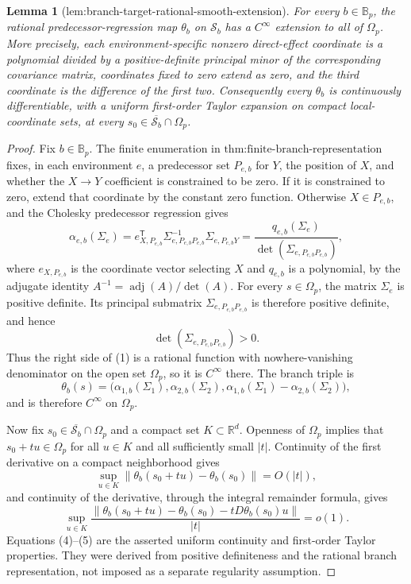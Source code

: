 \documentclass{article}
\newtheorem{lemma}{Lemma}
\begin{document}
\begin{lemma}[lem:branch-target-rational-smooth-extension]\label{lem:branch-target-rational-smooth-extension}
For every \(b\in\mathbb B_p\), the rational predecessor-regression map \(\theta_b\) on \(\mathcal S_b\) has a \(C^\infty\) extension to all of \(\Omega_p\). More precisely, each environment-specific nonzero direct-effect coordinate is a polynomial divided by a positive-definite principal minor of the corresponding covariance matrix, coordinates fixed to zero extend as zero, and the third coordinate is the difference of the first two. Consequently every \(\theta_b\) is continuously differentiable, with a uniform first-order Taylor expansion on compact local-coordinate sets, at every \(s_0\in\overline{\mathcal S_b}\cap\Omega_p\).
\end{lemma}
\begin{proof}
Fix \(b\in\mathbb B_p\). The finite enumeration in \(\text{thm:finite-branch-representation}\) fixes, in each environment \(e\), a predecessor set \(P_{e,b}\) for \(Y\), the position of \(X\), and whether the \(X\to Y\) coefficient is constrained to be zero. If it is constrained to zero, extend that coordinate by the constant zero function. Otherwise \(X\in P_{e,b}\), and the Cholesky predecessor regression gives
\[
 \alpha_{e,b}(\Sigma_e)
 =e_{X,P_{e,b}}^{\mathsf T}
   \Sigma_{e,P_{e,b}P_{e,b}}^{-1}
   \Sigma_{e,P_{e,b}Y}
 =\frac{q_{e,b}(\Sigma_e)}
        {\det(\Sigma_{e,P_{e,b}P_{e,b}})},
 \tag{1}
\]
where \(e_{X,P_{e,b}}\) is the coordinate vector selecting \(X\) and \(q_{e,b}\) is a polynomial, by the adjugate identity \(A^{-1}=\operatorname{adj}(A)/\det(A)\). For every \(s\in\Omega_p\), the matrix \(\Sigma_e\) is positive definite. Its principal submatrix \(\Sigma_{e,P_{e,b}P_{e,b}}\) is therefore positive definite, and hence
\[
 \det(\Sigma_{e,P_{e,b}P_{e,b}})>0.
 \tag{2}
\]
Thus the right side of (1) is a rational function with nowhere-vanishing denominator on the open set \(\Omega_p\), so it is \(C^\infty\) there. The branch triple is
\[
 \theta_b(s)=
 \bigl(\alpha_{1,b}(\Sigma_1),
       \alpha_{2,b}(\Sigma_2),
       \alpha_{1,b}(\Sigma_1)-\alpha_{2,b}(\Sigma_2)\bigr),
 \tag{3}
\]
and is therefore \(C^\infty\) on \(\Omega_p\).

Now fix \(s_0\in\overline{\mathcal S_b}\cap\Omega_p\) and a compact set \(K\subset\mathbb R^d\). Openness of \(\Omega_p\) implies that \(s_0+t u\in\Omega_p\) for all \(u\in K\) and all sufficiently small \(|t|\). Continuity of the first derivative on a compact neighborhood gives
\[
 \sup_{u\in K}\|\theta_b(s_0+t u)-\theta_b(s_0)\|=O(|t|),
 \tag{4}
\]
and continuity of the derivative, through the integral remainder formula, gives
\[
 \sup_{u\in K}
 \frac{\|\theta_b(s_0+t u)-\theta_b(s_0)
 -tD\theta_b(s_0)u\|}{|t|}=o(1).
 \tag{5}
\]
Equations (4)--(5) are the asserted uniform continuity and first-order Taylor properties. They were derived from positive definiteness and the rational branch representation, not imposed as a separate regularity assumption.
\end{proof}
\end{document}
